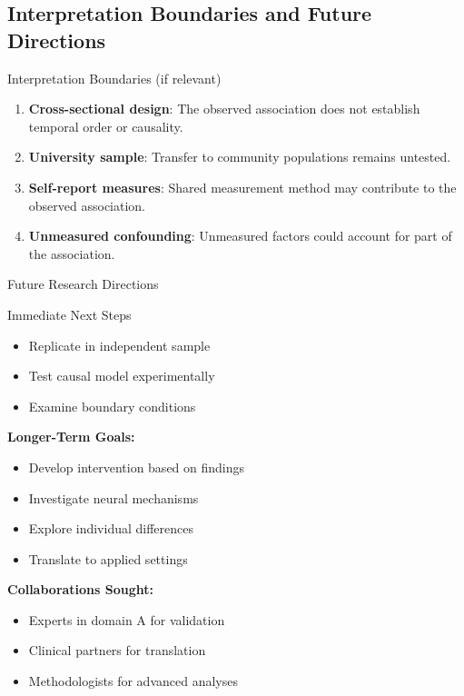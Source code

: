 \documentclass[aspectratio=169,11pt]{beamer}
\begin{document}
\subsection{Interpretation Boundaries and Future Directions}

\begin{frame}{Interpretation Boundaries (if relevant)}
  \begin{enumerate}
    \item \textbf{Cross-sectional design}: The observed association does not establish temporal order or causality.
    \item \textbf{University sample}: Transfer to community populations remains untested.
    \item \textbf{Self-report measures}: Shared measurement method may contribute to the observed association.
    \item \textbf{Unmeasured confounding}: Unmeasured factors could account for part of the association.
  \end{enumerate}
\end{frame}

\begin{frame}{Future Research Directions}
  \begin{block}{Immediate Next Steps}
    \begin{itemize}
      \item Replicate in independent sample
      \item Test causal model experimentally
      \item Examine boundary conditions
    \end{itemize}
  \end{block}

  \vspace{0.5cm}

  \textbf{Longer-Term Goals:}
  \begin{itemize}
    \item Develop intervention based on findings
    \item Investigate neural mechanisms
    \item Explore individual differences
    \item Translate to applied settings
  \end{itemize}

  \vspace{0.5cm}

  \textbf{Collaborations Sought:}
  \begin{itemize}
    \item Experts in domain A for validation
    \item Clinical partners for translation
    \item Methodologists for advanced analyses
  \end{itemize}
\end{frame}
\end{document}
